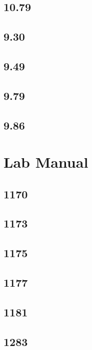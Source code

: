 \documentclass{article}
\begin{document}
\subsection{10.79}

\subsection{9.30}

\subsection{9.49}

\subsection{9.79}

\subsection{9.86}

\section{Lab Manual}

\subsection{1170}

\subsection{1173}

\subsection{1175}

\subsection{1177}

\subsection{1181}

\subsection{1283}
\end{document}
